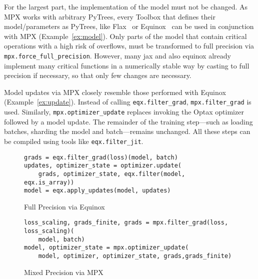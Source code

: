\documentclass[logo]{dsme}
\newcommand{\mpx}{\textsc{MPX}}
\begin{document}
For the largest part, the implementation of the model must not be changed.
As \mpx{} works with arbitrary PyTrees, every Toolbox that defines their model/parameters as PyTrees, like Flax~\citep{flax2020github} or Equinox~\citep{kidger2021equinox} can be used in conjunction with \mpx{} (Example~\ref{ex:model}). 
Only parts of the model that contain critical operations with a high risk of overflows, must be transformed to full precision via \texttt{mpx.force\_full\_precision}.
However, many jax and also equinox already implement many critical functions in a numerically stable way by casting to full precision if necessary, so that only few changes are necessary.

Model updates via \mpx{} closely resemble those performed with Equinox (Example~\ref{ex:update}). 
Instead of calling \texttt{eqx.filter\_grad}, \texttt{mpx.filter\_grad} is used. Similarly, \texttt{mpx.optimizer\_update} replaces invoking the Optax optimizer followed by a model update.
The remainder of the training step—such as loading batches, sharding the model and batch—remains unchanged. 
All these steps can be compiled using tools like \texttt{eqx.filter\_jit}.


\begin{example}[h]
    \centering
    \begin{subfigure}[t]{0.98\textwidth}
        \centering
        \begin{pbox}[]{}
            \begin{verbatim}
grads = eqx.filter_grad(loss)(model, batch)
updates, optimizer_state = optimizer.update(
    grads, optimizer_state, eqx.filter(model, eqx.is_array))
model = eqx.apply_updates(model, updates)
        \end{verbatim}
    \end{pbox}
        \caption{Full Precision via Equinox}
    \end{subfigure}\hspace{0.1cm}
    \begin{subfigure}[t]{0.98\textwidth}
        \centering
        \begin{pbox}[]{}
            \begin{verbatim}
loss_scaling, grads_finite, grads = mpx.filter_grad(loss, loss_scaling)(
    model, batch)
model, optimizer_state = mpx.optimizer_update(
    model, optimizer, optimizer_state, grads,grads_finite)
            \end{verbatim}
            \end{pbox}
            \caption{Mixed Precision via \mpx{}}
    \end{subfigure}
    \caption{Implementation of model updates via Equinox and \mpx{}. \mpx{} is designed such that its model update routine closely resembles the one of Equinox.}
    \label{ex:update}
\end{example}
\end{document}

